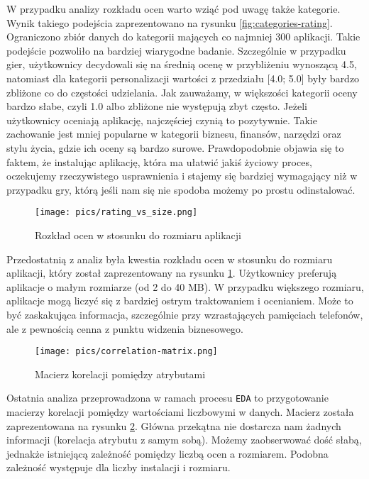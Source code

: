 \documentclass{article}
\begin{document}
W przypadku analizy rozkładu ocen warto wziąć pod uwagę także kategorie. Wynik takiego podejścia zaprezentowano na rysunku \ref{fig:categories-rating}. Ograniczono zbiór danych do kategorii mających co najmniej 300 aplikacji. Takie podejście pozwoliło na bardziej wiarygodne badanie. Szczególnie w przypadku gier, użytkownicy decydowali się na średnią ocenę w przybliżeniu wynoszącą 4.5, natomiast dla kategorii personalizacji wartości z przedziału [4.0; 5.0] były bardzo zbliżone co do częstości udzielania. Jak zauważamy, w większości kategorii oceny bardzo słabe, czyli 1.0 albo zbliżone nie występują zbyt często. Jeżeli użytkownicy oceniają aplikację, najczęściej czynią to pozytywnie. Takie zachowanie jest mniej popularne w kategorii biznesu, finansów, narzędzi oraz stylu życia, gdzie ich oceny są bardzo surowe. Prawdopodobnie objawia się to faktem, że instalując aplikację, która ma ułatwić jakiś życiowy proces, oczekujemy rzeczywistego usprawnienia i stajemy się bardziej wymagający niż w przypadku gry, którą jeśli nam się nie spodoba możemy po prostu odinstalować.

\begin{figure}[!h]
\centering
    \texttt{[image: pics/rating\_vs\_size.png]}
    \caption{Rozkład ocen w stosunku do rozmiaru aplikacji}
    \label{fig:rating-vs-size}
\end{figure}

Przedostatnią z analiz była kwestia rozkładu ocen w stosunku do rozmiaru aplikacji, który został zaprezentowany na rysunku \ref{fig:rating-vs-size}. Użytkownicy preferują aplikacje o małym rozmiarze (od 2 do 40 MB). W przypadku większego rozmiaru, aplikacje mogą liczyć się z bardziej ostrym traktowaniem i ocenianiem. Może to być zaskakująca informacja, szczególnie przy wzrastających pamięciach telefonów, ale z pewnością cenna z punktu widzenia biznesowego.

\begin{figure}[!h]
\centering
    \texttt{[image: pics/correlation-matrix.png]}
    \caption{Macierz korelacji pomiędzy atrybutami}
    \label{fig:macierz-korelacji}
\end{figure}

Ostatnia analiza przeprowadzona w ramach procesu \texttt{EDA} to przygotowanie macierzy korelacji pomiędzy wartościami liczbowymi w danych. Macierz została zaprezentowana na rysunku \ref{fig:macierz-korelacji}. Główna przekątna nie dostarcza nam żadnych informacji (korelacja atrybutu z samym sobą). Możemy zaobserwować dość słabą, jednakże istniejącą zależność pomiędzy liczbą ocen a rozmiarem. Podobna zależność występuje dla liczby instalacji i rozmiaru.
\end{document}
